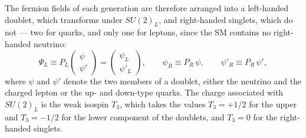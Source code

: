 The fermion fields of each generation are therefore arranged into a left-handed doublet, which transforms under $SU(2)_L$, and right-handed singlets, which do not — two for quarks, and only one for leptons, since the SM contains no right-handed neutrino:
\begin{equation}
    \Psi_L \equiv P_L\begin{pmatrix}\psi \\ \psi'\end{pmatrix}=\begin{pmatrix}\psi_L \\ \psi'_L\end{pmatrix}, \qquad
    \psi_R \equiv P_R\,\psi, \qquad
    \psi'_R \equiv P_R\,\psi',
    \label{fermionic_fields}
\end{equation}
where $\psi$ and $\psi'$ denote the two members of a doublet, either the neutrino and the charged lepton or the up- and down-type quarks. The charge associated with $SU(2)_L$ is the weak isospin $T_3$, which takes the values $T_3=+1/2$ for the upper and $T_3=-1/2$ for the lower component of the doublets, and $T_3=0$ for the right-handed singlets.

